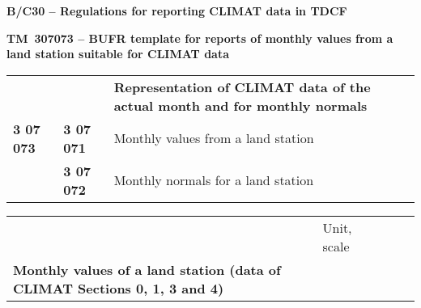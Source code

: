 \textbf{B/C30 -- Regulations for reporting CLIMAT data in TDCF}

\textbf{TM~307073 -- BUFR template for reports of monthly values from a land station suitable for CLIMAT data}

\begin{longtable}[]{@{}lll@{}}
\toprule
\endhead
& & \textbf{Representation of CLIMAT data of the actual month and for monthly normals}\tabularnewline
\textbf{3 07 073} & \textbf{3 07 071} & Monthly values from a land station\tabularnewline
& \textbf{3 07 072} & Monthly normals for a land station\tabularnewline
\bottomrule
\end{longtable}

\begin{longtable}[]{@{}lllll@{}}
\toprule
\endhead
& Unit, scale & & &\tabularnewline
\begin{minipage}[t]{0.17\columnwidth}\raggedright
\textbf{Monthly values of a land station (data of CLIMAT Sections 0, 1, 3 and 4)}


\end{minipage}
\end{longtable}
